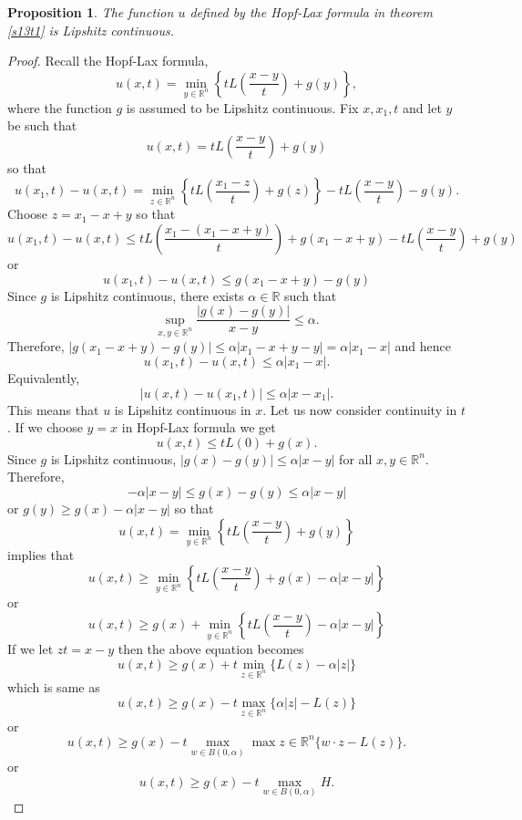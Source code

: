 \documentclass{article}
\theoremstyle{plain}
\numberwithin{thm}{section}
\theoremstyle{plain}
\newtheorem{prop}{Proposition}
\numberwithin{prop}{section}
\theoremstyle{definition}
\numberwithin{defn}{section}
\theoremstyle{remark}
\numberwithin{equation}{section}
\begin{document}
\begin{prop}\label{s13p7}
The function $u$ defined by the Hopf-Lax formula in theorem \ref{s13t1} is Lipshitz continuous.
\end{prop}
\begin{proof}
Recall the Hopf-Lax formula,
\[
u(x, t) = \min_{y \in \mathbb{R}^n}\left\{tL\left(\frac{x - y}{t}\right) + g(y)\right\},
\]
where the function $g$ is assumed to be Lipshitz continuous. Fix $x, x_1, t$ and let $y$ be
such that
\[
u(x, t) = tL\left(\frac{x - y}{t}\right) + g(y)
\]
so that
\[
u(x_1, t) - u(x, t) = \min_{z \in \mathbb{R}^n}\left\{tL\left(\frac{x_1 - z}{t}\right) + g(z)\right\} 
- tL\left(\frac{x - y}{t}\right) - g(y).
\]
Choose $z = x_1 - x + y$ so that
\[
u(x_1, t) - u(x, t) \le tL\left(\frac{x_1 - (x_1 - x + y)}{t}\right) + g(x_1 - x + y) -
tL\left(\frac{x - y}{t}\right) + g(y)
\]
or
\[
u(x_1, t) - u(x, t) \le g(x_1 - x + y) - g(y)
\]
Since $g$ is Lipshitz continuous, there exists $\alpha \in \mathbb{R}$ such that
\[
\sup_{x, y \in \mathbb{R}^n}\frac{|g(x) - g(y)|}{x - y} \le \alpha.
\]
Therefore, $|g(x_1 - x + y) - g(y)| \le \alpha|x_1 - x + y - y| = \alpha|x_1 - x|$ and hence
\[
u(x_1, t) - u(x, t) \le \alpha|x_1 - x|.
\]
Equivalently,
\begin{equation}\label{s13e24}
|u(x, t) - u(x_1, t)| \le \alpha |x - x_1|.
\end{equation}
This means that $u$ is Lipshitz continuous in $x$. Let us now consider continuity in $t$. If we 
choose $y = x$ in Hopf-Lax formula we get
\begin{equation}\label{s13e25}
u(x, t) \le tL(0) + g(x).
\end{equation}
Since $g$ is Lipshitz continuous, $|g(x) - g(y)| \le \alpha |x - y|$ for all $x, y \in \mathbb{R}^n$.
Therefore,
\[
-\alpha|x - y| \le g(x) - g(y) \le \alpha|x - y|
\]
or $g(y) \ge g(x) - \alpha|x - y|$ so that
\[
u(x, t) = \min_{y \in \mathbb{R}^n}\left\{tL\left(\frac{x - y}{t}\right) + g(y)\right\}
\]
implies that
\[
u(x, t) \ge \min_{y \in \mathbb{R}^n}
\left\{tL\left(\frac{x - y}{t}\right) + g(x) - \alpha|x - y|\right\}
\]
or
\[
u(x, t) \ge g(x) + \min_{y \in \mathbb{R}^n}
\left\{tL\left(\frac{x - y}{t}\right) - \alpha|x - y|\right\}
\]
If we let $zt = x - y$ then the above equation becomes
\[
u(x, t) \ge g(x) + t \min_{z \in \mathbb{R}^n}\{L(z) - \alpha |z|\}
\]
which is same as
\[
u(x, t) \ge g(x) - t \max_{z \in \mathbb{R}^n}\{\alpha |z| - L(z)\}
\]
or
\[
u(x, t) \ge g(x) - t \max_{w \in B(0, \alpha)}\max{z \in \mathbb{R}^n}\{w \cdot z - L(z)\}.
\]
or
\begin{equation}\label{s13e26}
u(x, t) \ge g(x) - t \max_{w \in B(0, \alpha)}H.
\end{equation}


\end{proof}
\end{document}
